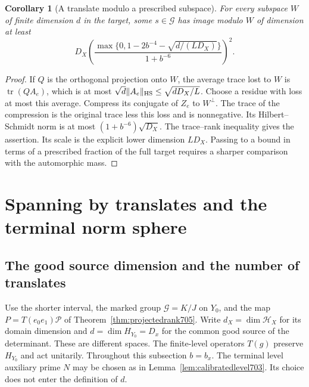 \documentclass[a4paper,11pt]{article}
\newtheorem{corollary}[proposition]{Corollary}
\theoremstyle{definition}
\theoremstyle{remark}
\numberwithin{equation}{section}
\begin{document}
\begin{corollary}[A translate modulo a prescribed subspace]\leavevmode
\label{cor:avoidspace706}
For every subspace \(W\) of finite dimension \(d\) in the
target, some \(s\in\mathcal G\) has image modulo \(W\)
of dimension at least
\[
 D_X\left(\frac{\max\{0,1-2b^{-4}-\sqrt{d/(LD_X)}\}}
                       {1+b^{-6}}\right)^2 .
\]
\end{corollary}
\begin{proof}
If \(Q\) is the orthogonal projection onto \(W\), the
average trace lost to \(W\) is \(\operatorname{tr}(QA_e)\),
which is at most \(\sqrt{d}\|A_e\|_{\rm HS}\le\sqrt{dD_X/L}\).
Choose a residue with loss at most this average. Compress
its conjugate of \(Z_e\) to \(W^\perp\). The trace of the
compression is the original trace less this loss and is
nonnegative. Its Hilbert--Schmidt norm is at most
\((1+b^{-6})\sqrt{D_X}\). The trace--rank inequality gives
the assertion. Its scale is the explicit lower dimension
\(LD_X\). Passing to a bound in terms of a prescribed
fraction of the full target requires a sharper comparison
with the automorphic mass.
\end{proof}

\section{Spanning by translates and the terminal norm sphere}\label{nav:spanning-and-sphere}

\subsection{The good source dimension and the number of translates}
\label{sec:fewtranslates868}
Use the shorter interval, the marked group \(\mathcal G=K/J\)
on \(Y_0\), and the map \(P=T(e_0e_1)\mathcal P\) of
Theorem~\ref{thm:projectedrank705}. Write \(d_X=\dim\mathcal H_X\)
for its domain dimension and \(d=\dim H_{Y_0}=D_x\) for the
common good source of the determinant. These are different
spaces. The finite-level operators \(T(g)\) preserve \(H_{Y_0}\)
and act unitarily. Throughout this subsection \(b=b_x\).
The terminal level auxiliary prime \(N\) may be chosen as in
Lemma~\ref{lem:calibratedlevel703}. Its choice does not enter
the definition of \(d\).
\end{document}
